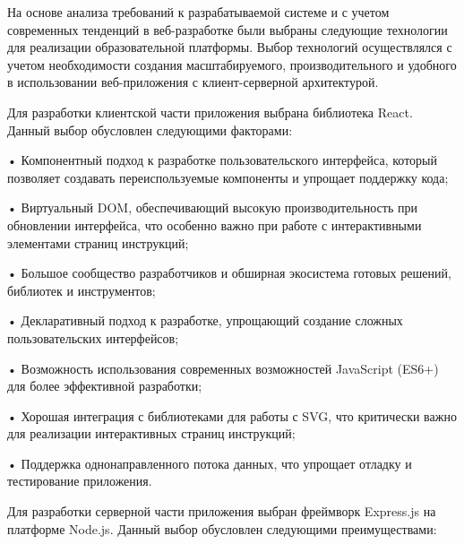 \subtitlespace

{\gostFont

  \par \redline На основе анализа требований к разрабатываемой системе и с учетом современных тенденций в веб-разработке были выбраны следующие технологии для реализации образовательной платформы. Выбор технологий осуществлялся с учетом необходимости создания масштабируемого, производительного и удобного в использовании веб-приложе\-ния с клиент-серверной архитектурой.

  \par \redline Для разработки клиентской части приложения выбрана библиотека React. Данный выбор обусловлен следующими факторами:
  
  \par \redline • Компонентный подход к разработке пользовательского интерфейса, который позволяет создавать переиспользуемые компоненты и упрощает поддержку кода;
  \par \redline • Виртуальный DOM, обеспечивающий высокую производительность при обновлении интерфейса, что особенно важно при работе с интерактивными элементами страниц инструкций;
  \par \redline • Большое сообщество разработчиков и обширная экосистема готовых решений, библиотек и инструментов;
  \par \redline • Декларативный подход к разработке, упрощающий создание сложных пользовательских интерфейсов;
  \par \redline • Возможность использования современных возможностей JavaScript (ES6+) для более эффективной разработки;
  \par \redline • Хорошая интеграция с библиотеками для работы с SVG, что критически важно для реализации интерактивных страниц инструкций;
  \par \redline • Поддержка однонаправленного потока данных, что упрощает отладку и тестирование приложения.

  \par \redline Для разработки серверной части приложения выбран фреймворк Express.js на платформе Node.js. Данный выбор обусловлен следующими преимуществами:
  
}
